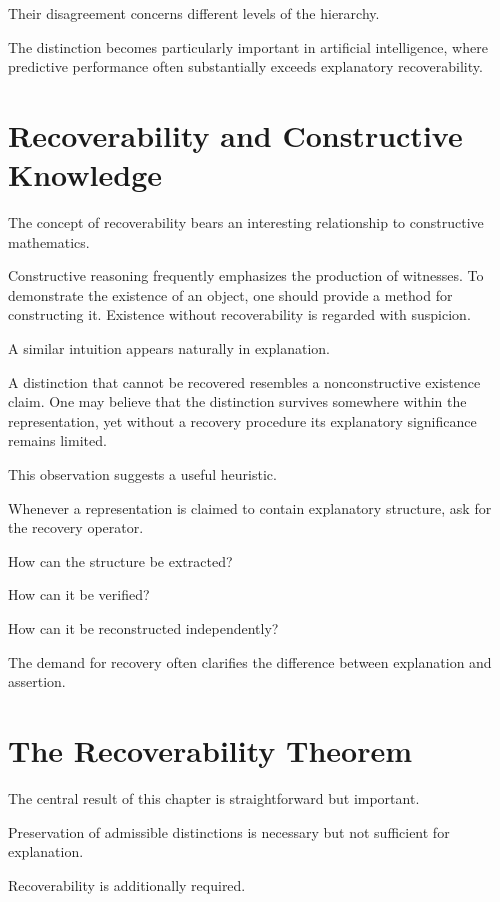 \documentclass[11pt,oneside,openany]{book}
\begin{document}
Their disagreement concerns different levels of the hierarchy.

The distinction becomes particularly important in artificial intelligence, where predictive performance often substantially exceeds explanatory recoverability.

\section{Recoverability and Constructive Knowledge}

The concept of recoverability bears an interesting relationship to constructive mathematics.

Constructive reasoning frequently emphasizes the production of witnesses. To demonstrate the existence of an object, one should provide a method for constructing it. Existence without recoverability is regarded with suspicion.

A similar intuition appears naturally in explanation.

A distinction that cannot be recovered resembles a nonconstructive existence claim. One may believe that the distinction survives somewhere within the representation, yet without a recovery procedure its explanatory significance remains limited.

This observation suggests a useful heuristic.

Whenever a representation is claimed to contain explanatory structure, ask for the recovery operator.

How can the structure be extracted?

How can it be verified?

How can it be reconstructed independently?

The demand for recovery often clarifies the difference between explanation and assertion.

\section{The Recoverability Theorem}

The central result of this chapter is straightforward but important.

\begin{theorem}

Preservation of admissible distinctions is necessary but not sufficient for explanation.

Recoverability is additionally required.

\end{theorem}
\end{document}
